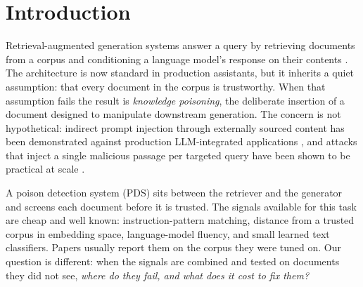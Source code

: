 \section{Introduction}

Retrieval-augmented generation systems answer a query by retrieving documents
from a corpus and conditioning a language model's response on their contents
\cite{lewis2020rag}. The architecture is now standard in production assistants, but it inherits a
quiet assumption: that every document in the corpus is trustworthy. When that
assumption fails the result is \textit{knowledge poisoning}, the deliberate
insertion of a document designed to manipulate downstream generation. The concern
is not hypothetical: indirect prompt injection through externally sourced content
has been demonstrated against production LLM-integrated applications
\cite{greshake2023indirect,yi2023benchmarking}, and attacks that inject a single malicious passage per
targeted query have been shown to be practical at scale \cite{zhang2025practical}.

A poison detection system (PDS) sits between the retriever and the generator and
screens each document before it is trusted. The signals available for this
task are cheap and well known: instruction-pattern matching, distance from a
trusted corpus in embedding space, language-model fluency, and small learned text
classifiers. Papers usually report them on the corpus they were tuned on. Our
question is different: when the signals are combined and tested on documents they
did not see, \emph{where do they fail, and what does it cost to fix them?}

